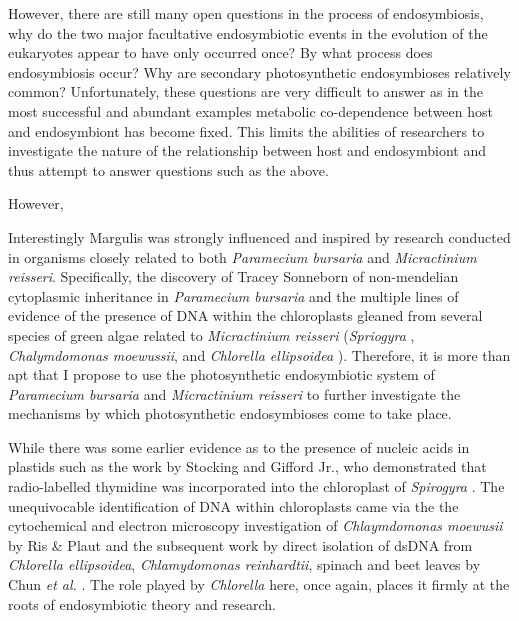 However, there are still many open questions in the process of endosymbiosis,
why do the two major facultative endosymbiotic events in the evolution of the eukaryotes
appear to have only occurred once? By what process does endosymbiosis occur?
Why are secondary photosynthetic endosymbioses relatively common?
Unfortunately, these questions are very difficult to answer as in the most successful
and abundant examples metabolic co-dependence between host and endosymbiont has become
fixed.  This limits the abilities of researchers to investigate the nature of the
relationship between host and endosymbiont and thus attempt to answer questions
such as the above. 

However,  









Interestingly Margulis was strongly influenced and inspired by research conducted
in organisms closely related to both \textit{Paramecium bursaria} and 
\textit{Micractinium reisseri}. Specifically, the discovery of Tracey Sonneborn
of non-mendelian cytoplasmic inheritance in \textit{Paramecium bursaria} \citep{Sonneborn1950}
and the multiple lines of evidence of the presence of DNA within the chloroplasts
gleaned from several species of green algae related to \textit{Micractinium reisseri}
(\textit{Spriogyra} \citep{Stocking1959}, \textit{Chalymdomonas moewussii}, and 
\textit{Chlorella ellipsoidea} \cite{Ris1962}).  Therefore, it is more than apt
that I propose to use the photosynthetic endosymbiotic system of \textit{Paramecium bursaria}
and \textit{Micractinium reisseri} to further investigate the mechanisms by which
photosynthetic endosymbioses come to take place.











While there was some earlier evidence as to the presence of nucleic acids in 
plastids such as the work by Stocking and Gifford Jr., who demonstrated that
radio-labelled thymidine was incorporated into the chloroplast of \textit{Spirogyra}
\citep{Stocking1959}.
The unequivocable identification of DNA within chloroplasts came via the 
the cytochemical and electron microscopy investigation of \textit{Chlaymdomonas moewusii} 
by Ris \& Plaut \citep{Ris1962} and the subsequent work by direct isolation of
dsDNA from \textit{Chlorella ellipsoidea}, \textit{Chlamydomonas reinhardtii}, spinach
and beet leaves by Chun \textit{et al.} \citep{Chun1963}. The role played by
\textit{Chlorella} here, once again, places it firmly at the roots of endosymbiotic
theory and research.






